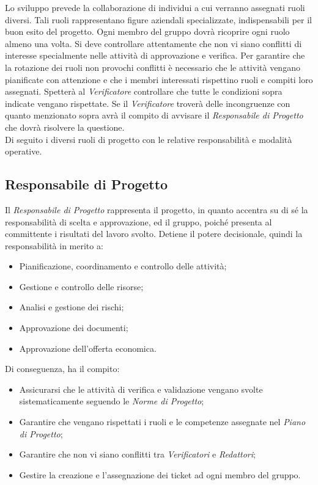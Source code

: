 Lo sviluppo prevede la collaborazione di individui a cui verranno assegnati ruoli diversi. Tali ruoli rappresentano figure aziendali specializzate, indispensabili per il buon esito del progetto. Ogni membro del gruppo dovrà ricoprire ogni ruolo almeno una volta. Si deve controllare attentamente che non vi siano conflitti di interesse specialmente nelle attività di approvazione e verifica. Per garantire che la rotazione dei ruoli non provochi conflitti è necessario che le attività vengano pianificate con attenzione e che i membri interessati rispettino ruoli e compiti loro assegnati. Spetterà al \textit{Verificatore} controllare che tutte le condizioni sopra indicate vengano rispettate. Se il \textit{Verificatore} troverà delle incongruenze con quanto menzionato sopra avrà il compito di avvisare il \textit{Responsabile di Progetto} che dovrà risolvere la questione.\\
Di seguito i diversi ruoli di progetto con le relative responsabilità e modalità operative.
\subsection{Responsabile di Progetto}
Il \textit{Responsabile di Progetto} rappresenta il progetto, in quanto accentra su di sé la responsabilità di scelta e approvazione, ed il gruppo, poiché presenta al committente i risultati del lavoro svolto.
Detiene il potere decisionale, quindi la responsabilità in merito a:
\begin{itemize}
	\item Pianificazione, coordinamento e controllo delle attività;
	\item Gestione e controllo delle risorse;
	\item Analisi e gestione dei rischi;
	\item Approvazione dei documenti;
	\item Approvazione dell'offerta economica.
\end{itemize}
Di conseguenza, ha il compito:
\begin{itemize}
	\item Assicurarsi che le attività di verifica e validazione vengano svolte sistematicamente seguendo le \textit{Norme di Progetto};
	\item Garantire che vengano rispettati i ruoli e le competenze assegnate nel \textit{Piano di Progetto};
	\item Garantire che non vi siano conflitti tra \textit{Verificatori} e \textit{Redattori};
	\item Gestire la creazione e l'assegnazione dei ticket ad ogni membro del gruppo.
\end{itemize}
